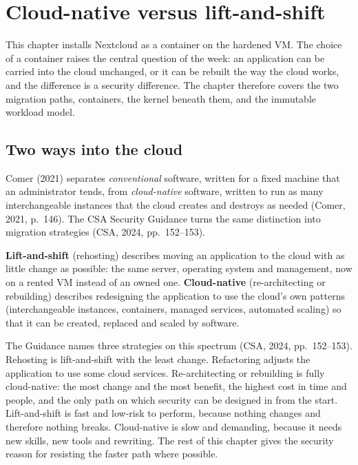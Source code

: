 \chapter{Cloud-native versus lift-and-shift}

This chapter installs Nextcloud as a container on the hardened VM. The
choice of a container raises the central question of the week: an
application can be carried into the cloud unchanged, or it can be rebuilt
the way the cloud works, and the difference is a security difference. The
chapter therefore covers the two migration paths, containers, the kernel
beneath them, and the immutable workload model.

\section{Two ways into the cloud}

Comer (2021) separates \emph{conventional} software, written for a fixed
machine that an administrator tends, from \emph{cloud-native} software,
written to run as many interchangeable instances that the cloud creates and
destroys as needed (Comer, 2021, p.~146). The CSA Security Guidance turns
the same distinction into migration strategies (CSA, 2024, pp.~152--153).

\begin{definition}\label{def:migration}
\textbf{Lift-and-shift} (rehosting) describes moving an application to the
cloud with as little change as possible: the same server, operating system and
management, now on a rented VM instead of an owned one. \textbf{Cloud-native}
(re-architecting or rebuilding) describes redesigning the application to use
the cloud's own patterns (interchangeable instances, containers, managed
services, automated scaling) so that it can be created, replaced and scaled
by software.
\end{definition}

The Guidance names three strategies on this spectrum (CSA, 2024,
pp.~152--153). Rehosting is lift-and-shift with the least change.
Refactoring adjusts the application to use some cloud services.
Re-architecting or rebuilding is fully cloud-native: the most change and the
most benefit, the highest cost in time and people, and the only path on
which security can be designed in from the start. Lift-and-shift is fast and
low-risk to perform, because nothing changes and therefore nothing breaks.
Cloud-native is slow and demanding, because it needs new skills, new tools
and rewriting. The rest of this chapter gives the security reason for
resisting the faster path where possible.

